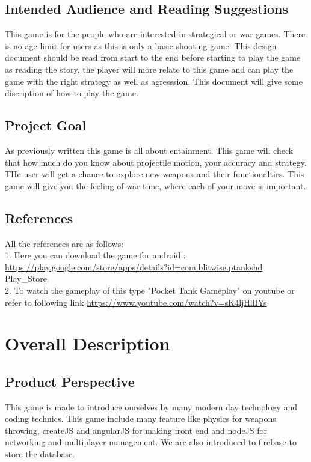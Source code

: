 \documentclass{scrreprt}
\begin{document}
\section{Intended Audience and Reading Suggestions}
$ $This game is for the people who are interested in strategical or war games. There is no  age limit for users as this is only a basic shooting game. This design document should be read from start to the end before starting to play the game as reading the story, the player will more relate to this game and can play the game with the right strategy as well as agresssion. This document will give some discription of how to play the game.$ $

\section{Project Goal}
$ $As previously written this game is all about entainment. This game will check that how much do you know about projectile motion, your accuracy and strategy. THe user will get a chance to explore new weapons and their functionalties. This game will give you the feeling of war time, where each of your move is important.$ $

\section{References}
$ $All the references are as follows:\\
1. Here you can download the game for android : \url{https://play.google.com/store/apps/details?id=com.blitwise.ptankshd} Play_Store. \\
2. To watch the gameplay of this type "Pocket Tank Gameplay" on youtube or refer to following link \url{https://www.youtube.com/watch?v=sK4ljHllIYs} \\$ $


\chapter{Overall Description}

\section{Product Perspective}
$ $This game is made to introduce ourselves by many modern day technology and coding technics. This game include many feature like physics for weapons throwing, createJS and angularJS for making front end and nodeJS for networking and multiplayer management. We are also introduced to firebase to store the database. $ $
\end{document}
